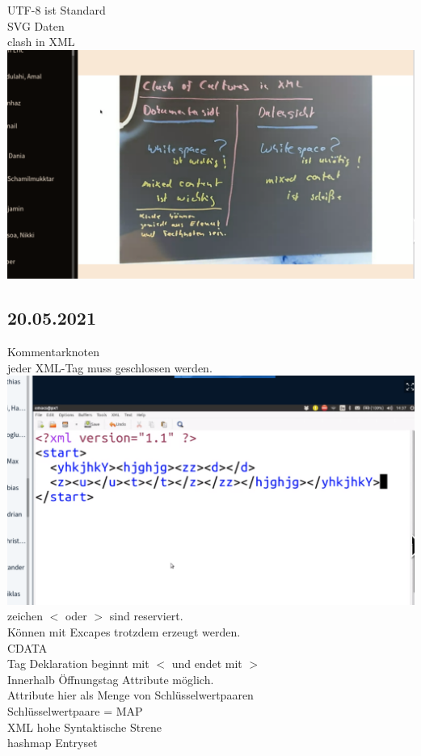 \documentclass[paper=A4]{article}
\begin{document}
	UTF-8 ist Standard \\
	SVG Daten \\
	clash in XML \\
	\includegraphics[width=\linewidth]{xmld} \\
	\subsection*{20.05.2021}
	Kommentarknoten \\
	jeder XML-Tag muss geschlossen werden.  \\ 
	\includegraphics[width=\linewidth]{xmlsample}
	zeichen $<$ oder $>$ sind reserviert. \\
	Können mit Excapes trotzdem erzeugt werden. \\
	CDATA \\
	Tag Deklaration beginnt mit $<$ und endet mit $>$
	\\
	Innerhalb Öffnungstag Attribute möglich. \\
	Attribute hier als Menge von Schlüsselwertpaaren \\
	Schlüsselwertpaare = MAP \\
	XML hohe Syntaktische Strene \\
	hashmap Entryset \\
\end{document}

